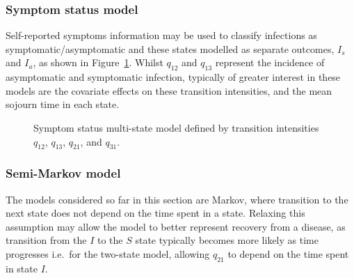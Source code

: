 \subsubsection{Symptom status model}

Self-reported symptoms information may be used to classify infections as symptomatic/asymptomatic and these states modelled as separate outcomes, $I_s$ and $I_a$, as shown in Figure~\ref{fig:symptom-model}. Whilst $q_{12}$ and $q_{13}$ represent the incidence of asymptomatic and symptomatic infection, typically of greater interest in these models are the covariate effects on these transition intensities, and the mean sojourn time in each state.

\begin{figure}[htbp!]
    \centering
    \caption[Symptom status multi-state model]{Symptom status multi-state model defined by transition intensities $q_{12}$, $q_{13}$, $q_{21}$, and $q_{31}$.}\label{fig:symptom-model}
\end{figure}

\subsubsection{Semi-Markov model}

The models considered so far in this section are Markov, where transition to the next state does not depend on the time spent in a state. Relaxing this assumption may allow the model to better represent recovery from a disease, as transition from the $I$ to the $S$ state typically becomes more likely as time progresses i.e.\ for the two-state model, allowing $q_{21}$ to depend on the time spent in state $I$.

